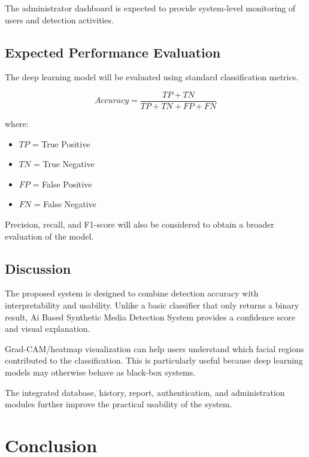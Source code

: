 \documentclass[12pt,a4paper,oneside]{report}
\begin{document}
The administrator dashboard is expected to provide system-level monitoring of users and detection activities.

\section{Expected Performance Evaluation}

The deep learning model will be evaluated using standard classification metrics.

\begin{equation}
Accuracy =
\frac{TP + TN}{TP + TN + FP + FN}
\end{equation}

where:

\begin{itemize}
    \item $TP$ = True Positive
    \item $TN$ = True Negative
    \item $FP$ = False Positive
    \item $FN$ = False Negative
\end{itemize}

Precision, recall, and F1-score will also be considered to obtain a broader evaluation of the model.

\section{Discussion}

The proposed system is designed to combine detection accuracy with interpretability and usability. Unlike a basic classifier that only returns a binary result, Ai Based Synthetic Media Detection System provides a confidence score and visual explanation.

Grad-CAM/heatmap visualization can help users understand which facial regions contributed to the classification. This is particularly useful because deep learning models may otherwise behave as black-box systems.

The integrated database, history, report, authentication, and administration modules further improve the practical usability of the system.


\chapter{Conclusion}
\end{document}
